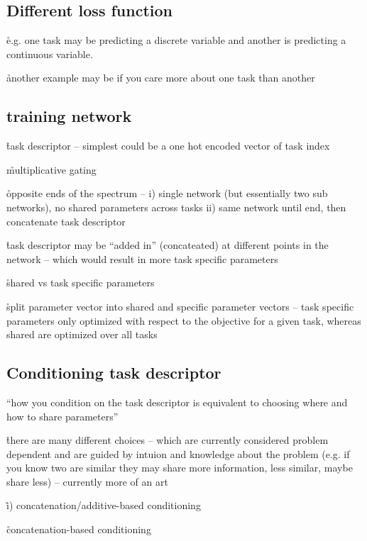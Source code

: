 \subsection{Different loss function}

\r{e.g. one task may be predicting a discrete variable and another is predicting a continuous variable.}

\r{another example may be if you care more about one task than another}

\subsection{training network}

\r{task descriptor -- simplest could be a one hot encoded vector of task index}


\r{multiplicative gating}

\r{opposite ends of the spectrum -- i) single network (but essentially two sub networks), no shared parameters across tasks ii) same network until end, then concatenate task descriptor}


\r{task descriptor may be ``added in'' (concateated) at different points in the network -- which would result in more task specific parameters}


\r{shared vs task specific parameters}

\r{split parameter vector into shared and specific parameter vectors --  task specific parameters only optimized with respect to the objective for a given task, whereas shared are optimized over all tasks}

\subsection{Conditioning task descriptor}

\r{``how you condition on the task descriptor is equivalent to choosing where and how to share parameters''}

\r{there are many different choices -- which are currently considered problem dependent and are guided by intuion and knowledge about the problem (e.g. if you know two are similar they may share more information, less similar, maybe share less) -- currently more of an art}

\r{i) concatenation/additive-based conditioning}

\r{concatenation-based conditioning}


